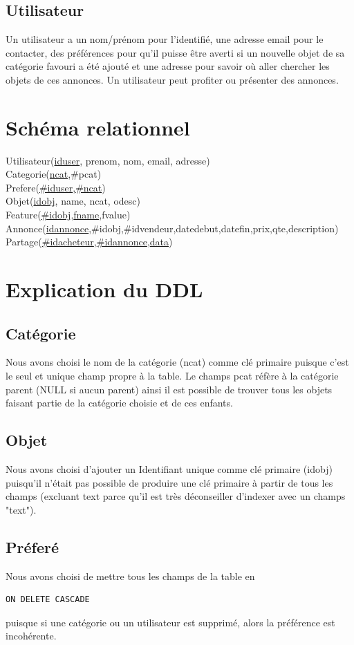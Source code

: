 \documentclass[a4paper,12pt]{article}
\begin{document}
\begin{spacing}{1}
	\subsection*{Utilisateur}
	Un utilisateur a un nom/prénom pour l'identifié, une adresse email pour le contacter, des préférences pour qu'il puisse être averti si un nouvelle objet de sa catégorie favouri  a été ajouté et une adresse pour savoir où aller chercher les objets de ces annonces. Un utilisateur peut profiter ou présenter des annonces.
	\section*{Schéma relationnel}
	Utilisateur(\underline{iduser}, prenom, nom, email, adresse)\\
	Categorie(\underline{ncat},\#pcat)\\
	Prefere(\underline{\#iduser},\underline{\#ncat})\\
	Objet(\underline{idobj}, name, ncat, odesc)\\
	Feature(\underline{\#idobj},\underline{fname},fvalue)\\
	Annonce(\underline{idannonce},\#idobj,\#idvendeur,datedebut,datefin,prix,qte,description)\\
	Partage(\underline{\#idacheteur},\underline{\#idannonce},\underline{data})
	\section*{Explication du DDL}
	\subsection*{Catégorie}
	Nous avons choisi le nom de la catégorie (ncat) comme clé primaire puisque c'est le seul et unique champ propre à la table. Le champs pcat réfère à la catégorie parent (NULL si aucun parent) ainsi il est possible de trouver tous les objets faisant partie de la catégorie choisie et de ces enfants.
	\subsection*{Objet}
	Nous avons choisi d'ajouter un Identifiant unique comme clé primaire (idobj) puisqu'il n'était pas possible de produire une clé primaire à partir de tous les champs (excluant text parce qu'il est très déconseiller d'indexer avec un champs "text"). 
	\subsection*{Préferé}
	Nous avons choisi de mettre tous les champs de la table en \begin{verbatim}ON DELETE CASCADE\end{verbatim} puisque si une catégorie ou un utilisateur est supprimé, alors la préférence est incohérente. 

\end{spacing}
\end{document}
